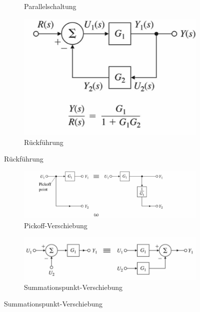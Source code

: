\begin{tcolorbox}[colback=white!10!white,colframe=blue!50!black,title=Regeln]
\begin{figure}[H]
\begin{subfigure}{.3\textwidth}
    \caption{Parallelschaltung}
    \label{fig:parallel}
        \end{subfigure}%
            \begin{subfigure}{.3\textwidth}
                \centering
                \includegraphics[width=1\textwidth]{content/img/back}
                \caption{Rückführung}
                \label{fig:back}
            \end{subfigure}%
    \end{figure}
\begin{figure}[H]

            \begin{subfigure}{.5\textwidth}
            \centering
            \includegraphics[width=1\textwidth]{content/img/verschiebung_punkt}
            \caption{Pickoff-Verschiebung}
            \label{fig:pickoff}
            \end{subfigure}%
            \begin{subfigure}{.5\textwidth}
                \centering
                \includegraphics[width=1\textwidth]{content/img/sum_front}
                \caption{Summationspunkt-Verschiebung}
                \label{fig:sum}
            \end{subfigure}%
            


\end{figure}
\end{tcolorbox}
